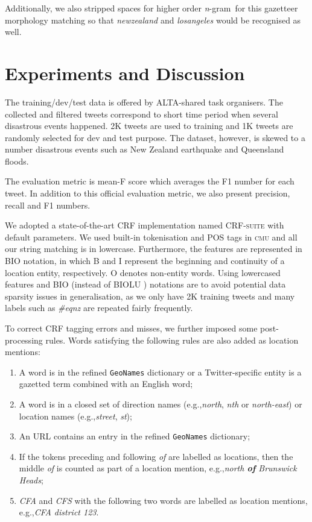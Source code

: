 \documentclass[11pt]{article}
\newcommand{\eg}{e.g.,\xspace}
\newcommand{\geoname}{\texttt{GeoNames}\xspace}
\newcommand{\myex}[1]{\textit{#1}}
\newcommand{\method}[1]{\textsf{#1}\xspace}
\newcommand{\ngram}{\textit{n}-gram\ }
\newcommand{\cmu}{\textsc{cmu}\xspace}
\newcommand{\crfsuite}{\textsc{CRF-suite}\xspace}
\begin{document}
Additionally, we also stripped spaces for higher order \ngram for this gazetteer morphology matching so that \myex{newzealand} and \myex{losangeles} would be recognised as well.

\section{Experiments and Discussion}
\label{sec:experiment}

The training/dev/test data is offered by ALTA-shared task organisers.
The collected and filtered tweets correspond to short time period when several disastrous events happened.
2K tweets are used to training and 1K tweets are randomly selected for dev and test purpose.
The dataset, however, is skewed to a number disastrous events such as New Zealand earthquake and Queensland floods.

The evaluation metric is mean-F score which averages the F1 number for each tweet.
In addition to this official evaluation metric, we also present precision, recall and F1 numbers.

We adopted a state-of-the-art CRF implementation named \crfsuite \cite{crfsuite} with default parameters.
We used built-in tokenisation and POS tags in \cmu and all our string matching is in lowercase.
Furthermore, the features are represented in \method{BIO} notation, in which \method{B} and \method{I} represent the beginning and continuity of a location entity, respectively.
\method{O} denotes non-entity words.
Using lowercased features and \method{BIO} (instead of \method{BIOLU} \cite{conll09rati}) notations are to avoid potential data sparsity issues in generalisation, as we only have 2K training tweets and many labels such as \myex{\#eqnz} are repeated fairly frequently.

To correct CRF tagging errors and misses, we further imposed some post-processing rules.
Words satisfying the following rules are also added as location mentions:

\begin{enumerate}
\item A word is in the refined \geoname dictionary or a Twitter-specific entity is a gazetted term combined with an English word;
\item A word is in a closed set of direction names (\eg \myex{north}, \myex{nth} or \myex{north-east}) or location names (\eg \myex{street}, \myex{st});
\item An URL contains an entry in the refined \geoname dictionary;
\item If the tokens preceding and following \myex{of} are labelled as locations, then the middle \myex{of} is counted as part of a location mention, \eg \myex{north \textbf{of} Brunswick Heads};
\item \myex{CFA} and \myex{CFS} with the following two words are labelled as location mentions, \eg \myex{CFA district 123}.
\end{enumerate}
\end{document}
